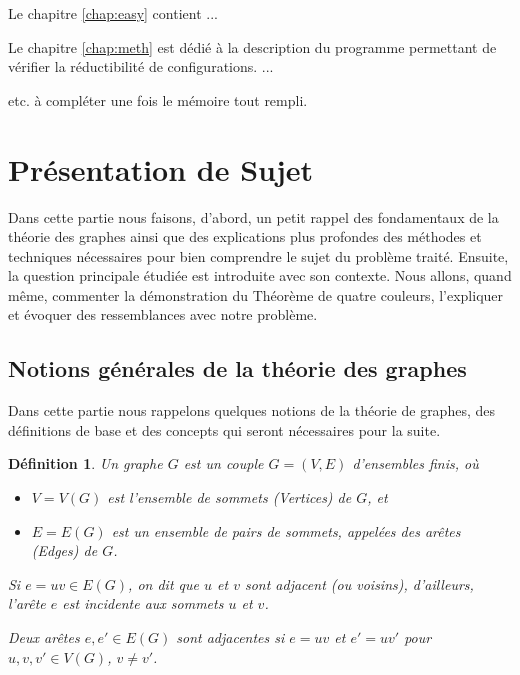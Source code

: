 \documentclass[10pt,a4paper]{article}
\newtheorem{definition}{Définition}
\begin{document}
Le chapitre \ref{chap:easy} contient ...

Le chapitre \ref{chap:meth} est dédié à la description du programme permettant de vérifier la réductibilité de configurations. ... 


etc. 
à compléter une fois le mémoire tout rempli.


\section{Présentation de Sujet}
\label{chap:pres}

Dans cette partie nous faisons, d'abord, un petit rappel des fondamentaux de la théorie des graphes ainsi que des explications plus profondes des méthodes et techniques nécessaires pour bien comprendre le sujet du problème traité. 
Ensuite, la question principale étudiée est introduite avec son contexte.
Nous allons, quand même, commenter la démonstration du Théorème de quatre couleurs, l'expliquer et évoquer des ressemblances avec notre problème. 

\subsection{Notions générales de la théorie des graphes}

Dans cette partie nous rappelons quelques notions de la théorie de graphes,  des définitions de base et des concepts qui seront nécessaires pour la suite. 

\begin{definition}
Un \emph{graphe} $G$ est un couple $G = (V,E)$ d'ensembles finis, où 
\begin{itemize}
\item $V=V(G)$ est l'ensemble de \emph{sommets (Vertices)} de $G$, et
\item $E=E(G)$ est un ensemble de pairs de sommets, appelées des \emph{arêtes (Edges)} de $G$.
\end{itemize}
Si $e = uv \in E(G)$, on dit que $u$ et $v$ sont \emph{adjacent} (ou \emph{voisins}), d'ailleurs, l'arête $e$ est \emph{incidente} aux sommets $u$ et $v$.

Deux arêtes $e,e'\in E(G)$ sont \emph{adjacentes} si $e=uv$ et $e'=uv'$ pour $u,v,v'\in V(G)$, $v\ne v'$.
\end{definition}
  
\end{document}
